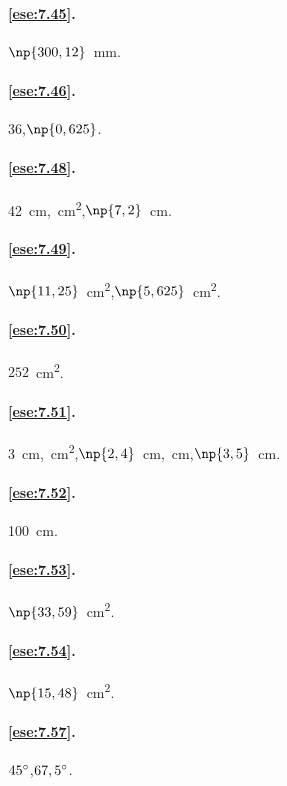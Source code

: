 \paragraph{\ref{ese:7.45}.}
$\np{300,12}$~mm.

\paragraph{\ref{ese:7.46}.}
36,\quad $\np{0,625}$.

\paragraph{\ref{ese:7.48}.}
42~cm,~cm\textsuperscript{2},\quad $\np{7,2}$~cm.

\paragraph{\ref{ese:7.49}.}
$\np{11,25}$~cm\textsuperscript{2},\quad $\np{5,625}$~cm\textsuperscript{2}.

\paragraph{\ref{ese:7.50}.}
$252$~cm\textsuperscript{2}.

\paragraph{\ref{ese:7.51}.}
3~cm,~cm\textsuperscript{2},\quad $\np{2,4}$~cm,~cm,\quad $\np{3,5}$~cm.

\paragraph{\ref{ese:7.52}.}
100~cm.

\paragraph{\ref{ese:7.53}.}
$\np{33,59}$~cm\textsuperscript{2}.

\paragraph{\ref{ese:7.54}.}
$\np{15,48}$~cm\textsuperscript{2}.

\paragraph{\ref{ese:7.57}.}
$45{}^{\circ}$,\quad $67,5{}^{\circ}$.

